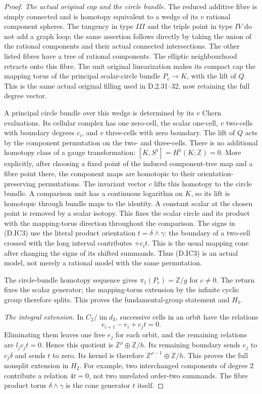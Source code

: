 \begin{proof}
\emph{The actual original cap and the circle bundle.}
The reduced additive fibre is simply connected and
is homotopy equivalent to a wedge of its $v$ rational
component spheres. The tangency in type $III$ and the
triple point in type $IV$ do not add a graph loop;
the same assertion follows directly by taking the
union of the rational components and their actual
connected intersections. The other listed fibres
have a tree of rational components.
The elliptic neighbourhood retracts onto this fibre.
The unit original linearization makes its compact
cap the mapping torus of the principal scalar-circle
bundle $P_c\to K$, with the lift of $Q$.
This is the same actual original filling used in
D.2.31--32, now retaining the full degree vector.

A principal circle bundle over this wedge is determined
by its $v$ Chern evaluations. Its cellular complex has
one zero-cell, the scalar one-cell, $v$ two-cells with
boundary degrees $c_i$, and $v$ three-cells with zero
boundary. The lift of $Q$ acts by the component
permutation on the two- and three-cells. There is no
additional homotopy class of a gauge transformation:
$[K,S^1]=H^1(K;\mathbb Z)=0$. More explicitly, after
choosing a fixed point of the induced component-tree
map and a fibre point there, the component maps are
homotopic to their orientation-preserving permutations.
The invariant vector $c$ lifts this homotopy to the
circle bundle. A comparison unit has a continuous
logarithm on $K$, so its lift is homotopic through
bundle maps to the identity. A constant scalar at
the chosen point is removed by a scalar isotopy.
This fixes the scalar circle and its product with
the mapping-torus direction throughout the comparison.
The signs in (D.IC3) use the literal product orientation
$t=\delta\wedge\gamma$: the boundary of a two-cell
crossed with the long interval contributes $+c_i t$.
This is the usual mapping cone after changing the signs
of its shifted summands. Thus (D.IC3) is an actual model, not
merely a rational model with the same permutation.

The circle-bundle homotopy sequence gives
$\pi_1(P_c)=\mathbb Z/g$ for $c\ne0$.
The return fixes the scalar generator; the mapping-torus
extension by the infinite cyclic group therefore splits.
This proves the fundamental-group statement and $H_1$.

\emph{The integral extension.}
In $C_2/\operatorname{im}d_3$, successive cells in an
orbit have the relations
\[
                  e_{i+1}-e_i+c_jt=0.
                                                        \tag{D.IC9}
\]
Eliminating them leaves one free $e_j$ for each orbit,
and the remaining relations are $l_jc_jt=0$.
Hence this quotient is
$\mathbb Z^\rho\oplus\mathbb Z/h$.
Its remaining boundary sends $e_j$ to $c_j\delta$
and sends $t$ to zero. Its kernel is therefore
$\mathbb Z^{\rho-1}\oplus\mathbb Z/h$.
This proves the full nonsplit extension in $H_2$.
For example, two interchanged components of degree
$2$ contribute a relation $4t=0$, not two unrelated
order-two summands. The fibre product torus
$\delta\wedge\gamma$ is the cone generator $t$ itself.


\end{proof}
